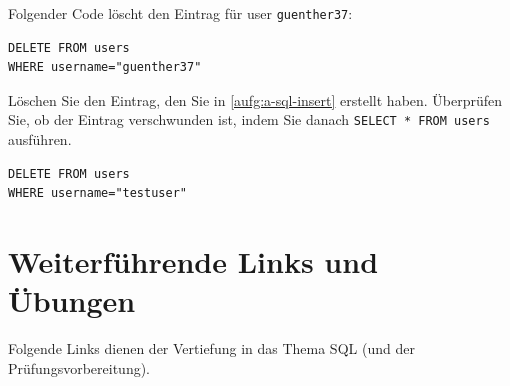 \begin{myexample}
Folgender Code löscht den Eintrag für user \texttt{guenther37}:
\begin{lstlisting}[style=sql]
DELETE FROM users
WHERE username="guenther37"
\end{lstlisting}
\end{myexample}

\begin{myexercise}
  Löschen Sie den Eintrag, den Sie in \cref{aufg:a-sql-insert} erstellt haben. Überprüfen Sie, ob der Eintrag verschwunden ist, indem Sie danach \lstinline[style=sql]|SELECT * FROM users| ausführen.
  \begin{myanswer}
    \begin{lstlisting}[style=sql]
DELETE FROM users
WHERE username="testuser"
\end{lstlisting}
  \end{myanswer}
\end{myexercise}

\section{Weiterführende Links und Übungen}
Folgende Links dienen der Vertiefung in das Thema \gls{SQL} (und der Prüfungsvorbereitung).

